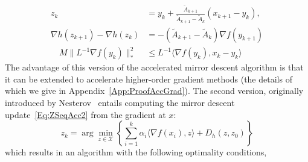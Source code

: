 \documentclass[11pt]{article}
\theoremstyle{plain}
\newcommand{\X}{{\mathcal X}}
\begin{document}
\begin{subequations}
\begin{align}
z_{k} &= y_k + \frac{\tilde A_{k+1}}{\tilde A_{k+1} -\tilde A_{k}} (x_{k+1} - y_k),  \label{Eq:ZSeqAcc3}\\%
\nabla h(z_{k+1}) - \nabla h(z_{k}) &= -(\tilde A_{k+1} -  \tilde A_{k})  \nabla f(y_{k+1})  \label{Eq:XSeqAcc3}\\ %
\quad M \|L^{-1} \nabla f(y_{k})\|_\ast^{2} &\leq L^{-1}\langle\nabla f(y_{k}), x_{k} - y_{k}\rangle \label{Eq:YSeqAcc3}
\end{align}
\end{subequations}
The advantage of this version of the accelerated mirror descent algorithm is that it can be extended to accelerate higher-order gradient methods (the details of which we give in Appendix~\ref{App:ProofAccGrad}). The second version, originally introduced by Nesterov~\cite{Nesterov05} entails computing the mirror descent update~\eqref{Eq:ZSeqAcc2} from the gradient at $x$:
\begin{equation*}
z_k = \arg \min_{z\in \X} \left\{ \sum_{i=1}^k \alpha_i \langle \nabla  f(x_i), z\rangle + D_h(z, z_0)\right\}
\end{equation*}
which results in an algorithm with the following optimality conditions, 
\end{document}
